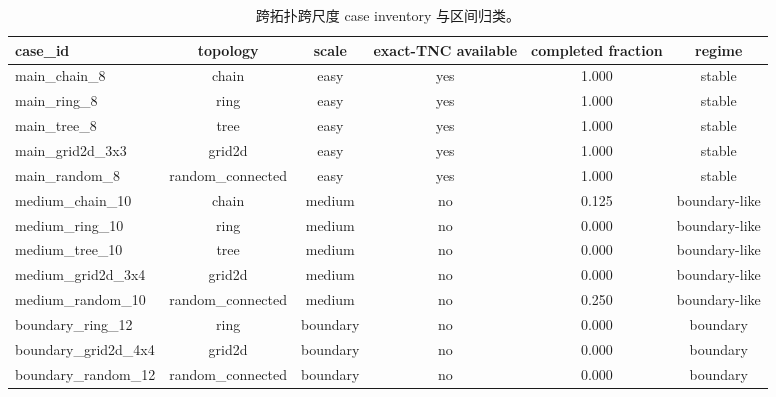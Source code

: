 ﻿\begin{table}[t]
\centering
\small
\caption{跨拓扑跨尺度 case inventory 与区间归类。}
\label{tab:regime-inventory}
\begin{tabular}{lccccc}
\toprule
case\_id & topology & scale & exact-TNC available & completed fraction & regime \\
\midrule
main\_chain\_8 & chain & easy & yes & 1.000 & stable \\
main\_ring\_8 & ring & easy & yes & 1.000 & stable \\
main\_tree\_8 & tree & easy & yes & 1.000 & stable \\
main\_grid2d\_3x3 & grid2d & easy & yes & 1.000 & stable \\
main\_random\_8 & random\_connected & easy & yes & 1.000 & stable \\
medium\_chain\_10 & chain & medium & no & 0.125 & boundary-like \\
medium\_ring\_10 & ring & medium & no & 0.000 & boundary-like \\
medium\_tree\_10 & tree & medium & no & 0.000 & boundary-like \\
medium\_grid2d\_3x4 & grid2d & medium & no & 0.000 & boundary-like \\
medium\_random\_10 & random\_connected & medium & no & 0.250 & boundary-like \\
boundary\_ring\_12 & ring & boundary & no & 0.000 & boundary \\
boundary\_grid2d\_4x4 & grid2d & boundary & no & 0.000 & boundary \\
boundary\_random\_12 & random\_connected & boundary & no & 0.000 & boundary \\
\bottomrule
\end{tabular}
\end{table}

\begin{table}[t]
\centering
\small
\caption{regime 级别汇总：easy 稳定，medium 已出现边界行为，boundary 完全超时。}
\label{tab:regime-summary}
\end{table}
